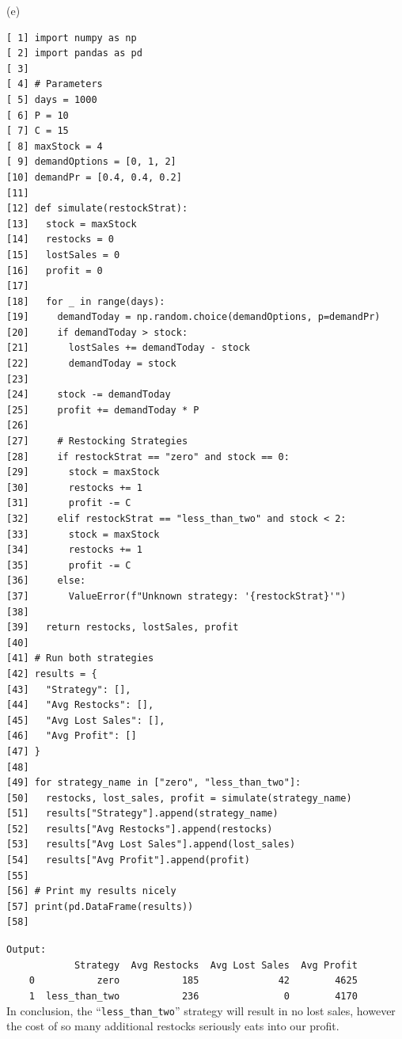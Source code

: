 \documentclass[a4paper,12pt]{report}
\begin{document}
\sol(e)
\begin{verbatim}
[ 1] import numpy as np
[ 2] import pandas as pd
[ 3] 
[ 4] # Parameters
[ 5] days = 1000
[ 6] P = 10
[ 7] C = 15
[ 8] maxStock = 4
[ 9] demandOptions = [0, 1, 2]
[10] demandPr = [0.4, 0.4, 0.2]
[11] 
[12] def simulate(restockStrat):
[13]   stock = maxStock
[14]   restocks = 0
[15]   lostSales = 0
[16]   profit = 0
[17] 
[18]   for _ in range(days):
[19]     demandToday = np.random.choice(demandOptions, p=demandPr)
[20]     if demandToday > stock:
[21]       lostSales += demandToday - stock
[22]       demandToday = stock
[23]         
[24]     stock -= demandToday
[25]     profit += demandToday * P
[26] 
[27]     # Restocking Strategies
[28]     if restockStrat == "zero" and stock == 0:
[29]       stock = maxStock
[30]       restocks += 1
[31]       profit -= C
[32]     elif restockStrat == "less_than_two" and stock < 2:
[33]       stock = maxStock
[34]       restocks += 1
[35]       profit -= C
[36]     else:
[37]       ValueError(f"Unknown strategy: '{restockStrat}'")
[38] 
[39]   return restocks, lostSales, profit
[40] 
[41] # Run both strategies
[42] results = {
[43]   "Strategy": [],
[44]   "Avg Restocks": [],
[45]   "Avg Lost Sales": [],
[46]   "Avg Profit": []
[47] }
[48] 
[49] for strategy_name in ["zero", "less_than_two"]:
[50]   restocks, lost_sales, profit = simulate(strategy_name)
[51]   results["Strategy"].append(strategy_name)
[52]   results["Avg Restocks"].append(restocks)
[53]   results["Avg Lost Sales"].append(lost_sales)
[54]   results["Avg Profit"].append(profit)
[55] 
[56] # Print my results nicely
[57] print(pd.DataFrame(results))
[58] 
\end{verbatim}
\verb|Output:|\\
\verb|            Strategy  Avg Restocks  Avg Lost Sales  Avg Profit|\\
\verb|    0           zero           185              42        4625|\\
\verb|    1  less_than_two           236               0        4170|\\

In conclusion, the ``\texttt{less\_than\_two}'' strategy will result in no lost sales, however the cost of so many additional restocks seriously eats into our profit.
\end{document}
